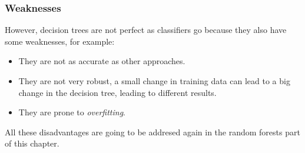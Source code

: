 \documentclass[11pt]{article}
\begin{document}
      \subsubsection{Weaknesses}
        However, decision trees are not perfect as classifiers go because they also have some weaknesses, for example:
        \begin{itemize}
        \item They are not as accurate as other approaches.\cite{isl}
        \item They are not very robust, a small change in training data can lead to a big change in the decision tree, leading to different results.\cite{isl}
        \item They are prone to {\it overfitting}.\cite{isl}
        \end{itemize}
        All these disadvantages are going to be addresed again in the random forests part of this chapter.
\end{document}
